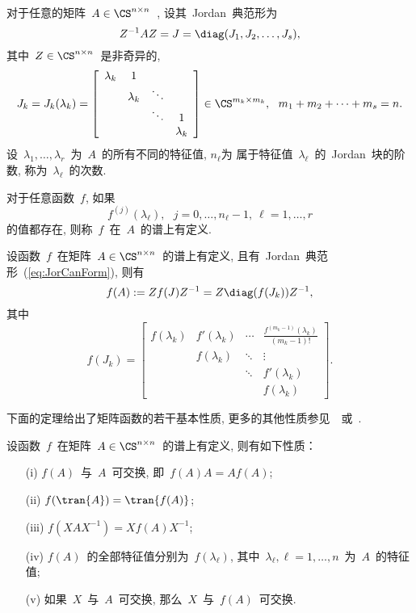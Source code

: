 对于任意的矩阵~$A \in \CS^{n\times n}$~, 设其~Jordan~典范形为
\begin{equation}
\label{eq:JorCanForm} Z^{-1}AZ = J = \diag(J_1,J_2,\ldots,J_s),
\end{equation}
其中~$Z\in\CS^{n\times n}$~是非奇异的,
$$
J_k = J_k(\lambda_k) = \left[\begin{array}{cccc} \lambda_k & 1 & & \\
 & \lambda_k & \ddots & \\
 & & \ddots & 1 \\
 & & & \lambda_k \end{array}\right] \in \CS^{m_k\times m_k}, \ \
 m_1 + m_2 + \cdots + m_s = n.
$$
设~$\lambda_1,\ldots, \lambda_r$~为~$A$~的所有不同的特征值,
$n_\ell$为 属于特征值~$\lambda_\ell$~的~Jordan~块的阶数,
称为~$\lambda_\ell$~的次数.

\begin{definition}
\label{def:fun_spectrum} 对于任意函数~$f$, 如果
$$
f^{(j)}(\lambda_\ell), \ \ \ j = 0, \ldots, n_\ell-1,\ \ell =
1,\ldots, r
$$
的值都存在, 则称~$f$~在~$A$~的谱上有定义.
\end{definition}

\begin{definition}
\label{def:MatFun} 设函数~$f$~在矩阵~$A \in \CS^{n\times
n}$~的谱上有定义, 且有~Jordan~典范形~(\ref{eq:JorCanForm}), 则有
\begin{equation}
\label{eq:MatFun} f(A) := Zf(J)Z^{-1} = Z\diag(f(J_k))Z^{-1},
\end{equation}
其中
$$
f(J_k) = \left[\begin{array}{cccc} f(\lambda_k) & f'(\lambda_k) & \cdots & \displaystyle \frac{f^{(m_k-1)}(\lambda_k)}{(m_k-1)!} \\
 & f(\lambda_k) & \ddots & \vdots\\
 & & \ddots & f'(\lambda_k) \\
 & & & f(\lambda_k) \end{array}\right].
$$
\end{definition}

下面的定理给出了矩阵函数的若干基本性质,
更多的其他性质参见~\cite{Higham2008}~或~\cite{HornJohnson1991}.

\begin{theorem}
\label{th:MatFunProperty} 设函数~$f$~在矩阵~$A\in\CS^{n\times
n}$~的谱上有定义, 则有如下性质：
\begin{enumerate}
\item[\textup{(i)}]
$f(A)$~与~$A$~可交换, 即~$f(A)A = Af(A)$;
\item[\textup{(ii)}]
$f(\tran{A})= \tran{f(A)}$;
\item[\textup{(iii)}]
$f(XAX^{-1}) = Xf(A)X^{-1}$;
\item[\textup{(iv)}]
$f(A)$~的全部特征值分别为~$f(\lambda_\ell)$, 其中~$\lambda_\ell,
\ell = 1,\ldots,n$~为~$A$~的特征值;
\item[\textup{(v)}]
如果~$X$~与~$A$~可交换, 那么~$X$~与~$f(A)$~可交换.
\end{enumerate}
\end{theorem}


